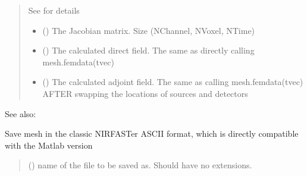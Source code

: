 \documentclass[letterpaper,10pt,english]{sphinxmanual}
\begin{document}
\begin{fulllineitems}
\begin{fulllineitems}
\begin{quote}
\begin{description}
\begin{itemize}
\sphinxAtStartPar
See {\hyperref[\detokenize{_autosummary/nirfasterff.utils.SolverOptions:nirfasterff.utils.SolverOptions}]{}} for details


\end{itemize}

\sphinxAtStartPar
\begin{itemize}
\item {} 
\sphinxAtStartPar
{} () \textendash{} The Jacobian matrix. Size (NChannel, NVoxel, NTime)

\item {} 
\sphinxAtStartPar
{} () \textendash{} The calculated direct field. The same as directly calling mesh.femdata(tvec)

\item {} 
\sphinxAtStartPar
{} () \textendash{} The calculated adjoint field. The same as calling mesh.femdata(tvec) AFTER swapping the locations of sources and detectors

\end{itemize}


\end{description}\end{quote}


\begin{sphinxseealso}{See also:}

\sphinxAtStartPar
{\hyperref[\detokenize{_autosummary/nirfasterff.inverse.jacobian_DCS:nirfasterff.inverse.jacobian_DCS}]{}}


\end{sphinxseealso}


\end{fulllineitems}


\begin{fulllineitems}
\label{\detokenize{_autosummary/nirfasterff.base.dcs_mesh.dcsmesh:nirfasterff.base.dcs_mesh.dcsmesh.save_nirfast}}
\pysigstartsignatures
{}
\pysigstopsignatures
\sphinxAtStartPar
Save mesh in the classic NIRFASTer ASCII format, which is directly compatible with the Matlab version
\begin{quote}\begin{description}
\sphinxAtStartPar
{} () \textendash{} name of the file to be saved as. Should have no extensions.


\end{description}
\end{quote}
\end{fulllineitems}
\end{fulllineitems}
\end{document}
